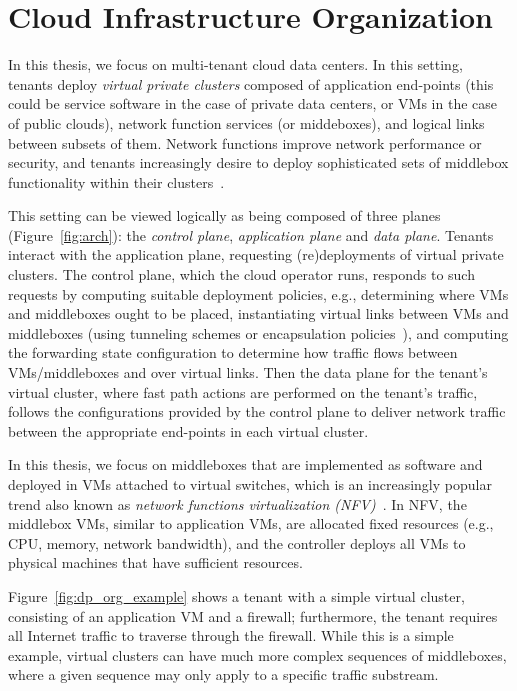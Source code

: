 \section{Cloud Infrastructure Organization}

In this thesis, we focus on multi-tenant cloud data centers.
In this setting, tenants deploy \emph{virtual private clusters}
composed of application end-points (this could be service software in
the case of private data centers, or VMs in the case of public
clouds), network function services (or middeboxes), and logical links
between subsets of them. Network functions improve network performance
or security, and tenants increasingly desire to deploy sophisticated
sets of middlebox functionality within their
clusters~\cite{koponen2014network}.

This setting can be viewed logically as being composed of three planes
(Figure~\ref{fig:arch}): the \emph{control plane}, \emph{application plane}
and \emph{data plane}.  Tenants interact with the application plane,
requesting (re)deployments of virtual private clusters. The control
plane, which the cloud operator runs, responds to such requests by
computing suitable deployment policies, e.g., determining where VMs
and middleboxes ought to be placed, instantiating virtual links
between VMs and middleboxes (using tunneling schemes or encapsulation
policies~\cite{koponen2014network}), and computing the forwarding
state configuration to determine how traffic flows between
VMs/middleboxes and over virtual links. Then the data plane for the tenant's
virtual cluster, where fast path actions are performed on the tenant's
traffic, follows the configurations provided by the control plane
to deliver network traffic between the appropriate end-points in each
virtual cluster.

In this thesis, we focus on middleboxes that are implemented as
software and deployed in VMs attached to virtual switches, which is an
increasingly popular trend also known as \emph{network functions
virtualization (NFV)}~\cite{chiosi2012network}. In NFV, the
middlebox VMs, similar to application VMs, are allocated fixed
resources (e.g., CPU, memory, network bandwidth), and the controller
deploys all VMs to physical machines that have sufficient resources.

Figure~\ref{fig:dp_org_example} shows a tenant with a simple
virtual cluster, consisting of an application VM and a firewall;
furthermore, the tenant requires all Internet traffic to traverse
through the firewall. While this is a simple example, virtual clusters
can have much more complex sequences of middleboxes, where a given
sequence may only apply to a specific traffic substream. 

